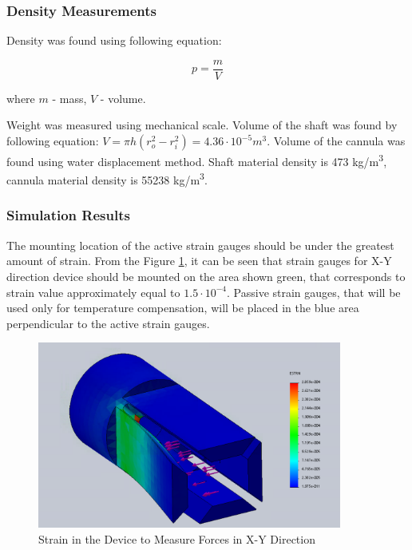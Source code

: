 	\subsubsection{Density Measurements}
	\label{sec:DenMeas}
Density was found using following equation:

\begin{equation}
p=\frac{m}{V}
\end{equation}

where $m$ - mass, $V$ - volume.

Weight was measured using mechanical scale. Volume of the shaft was found by following equation: $V =  \pi h(r_o^2-r_i^2) = 4.36 \cdot 10^{-5} m^3$. Volume of the cannula was found using water displacement method. Shaft material density is 473 kg/m\textsuperscript{3}, cannula material density is 55238 kg/m\textsuperscript{3}.

\subsubsection{Simulation Results}
\label{sec:FEAres}
The mounting location of the active strain gauges should be under the greatest amount of strain. From the Figure \ref{fig:XYdev}, it can be seen that strain gauges for X-Y direction device should be mounted on the area shown green, that corresponds to strain value approximately equal to $1.5 \cdot 10^{-4}$. Passive strain gauges, that will be used only for temperature compensation, will be placed in the blue area perpendicular to the active strain gauges.

\begin{figure}[h]
	\begin{center}
		\includegraphics[width=100mm]{fig/methods/old_sleeve.png}
	\end{center}
	\vspace{-4mm}
	\caption[Strain in the Device to Measure Forces in X-Y Direction]
	{Strain in the Device to Measure Forces in X-Y Direction}
	\label{fig:XYdev}
	\vspace{-2mm}
\end{figure}


